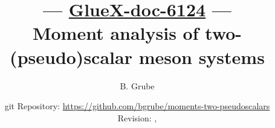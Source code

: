 \title{\textbf{--- \href{https://halldweb.jlab.org/doc-private/DocDB/ShowDocument?docid=6124}{GlueX-doc-6124} ---} \\
  Moment analysis of two-(pseudo)scalar meson systems}%

\date{\small git Repository: \url{https://github.com/bgrube/moments-two-pseudoscalars}
\\
Revision: \texttt{\href{}{\gitcommithash}}, \gitcommitdate}%

\author[1]{B. Grube}%

%
